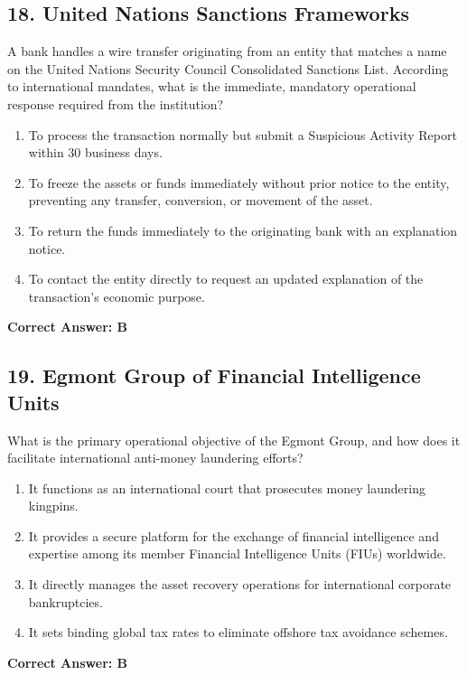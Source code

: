 \documentclass[11pt,a4paper]{article}
\begin{document}
	\subsection{18. United Nations Sanctions Frameworks}
	A bank handles a wire transfer originating from an entity that matches a name on the United Nations Security Council Consolidated Sanctions List. According to international mandates, what is the immediate, mandatory operational response required from the institution?
	\begin{enumerate}[label=\Alph*.]
		\item To process the transaction normally but submit a Suspicious Activity Report within 30 business days.
		\item To freeze the assets or funds immediately without prior notice to the entity, preventing any transfer, conversion, or movement of the asset.
		\item To return the funds immediately to the originating bank with an explanation notice.
		\item To contact the entity directly to request an updated explanation of the transaction's economic purpose.
	\end{enumerate}
	\textbf{Correct Answer: B}
	
	\subsection{19. Egmont Group of Financial Intelligence Units}
	What is the primary operational objective of the Egmont Group, and how does it facilitate international anti-money laundering efforts?
	\begin{enumerate}[label=\Alph*.]
		\item It functions as an international court that prosecutes money laundering kingpins.
		\item It provides a secure platform for the exchange of financial intelligence and expertise among its member Financial Intelligence Units (FIUs) worldwide.
		\item It directly manages the asset recovery operations for international corporate bankruptcies.
		\item It sets binding global tax rates to eliminate offshore tax avoidance schemes.
	\end{enumerate}
	\textbf{Correct Answer: B}
	
\end{document}
